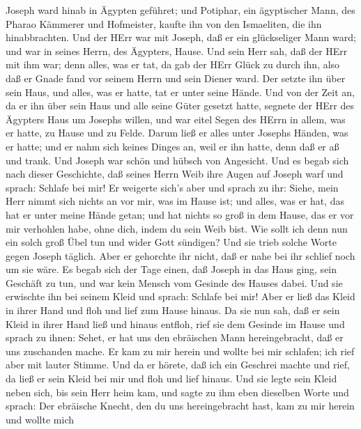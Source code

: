 Joseph ward hinab in Ägypten geführet; und Potiphar, ein
ägyptischer Mann, des Pharao Kämmerer und Hofmeister, kaufte ihn von den
Ismaeliten, die ihn hinabbrachten.  Und der HErr war mit
Joseph, daß er ein glückseliger Mann ward; und war in seines Herrn, des
Ägypters, Hause.  Und sein Herr sah, daß der HErr mit ihm
war; denn alles, was er tat, da gab der HErr Glück zu durch ihn,
 also daß er Gnade fand vor seinem Herrn und sein Diener
ward. Der setzte ihn über sein Haus, und alles, was er hatte, tat er
unter seine Hände.  Und von der Zeit an, da er ihn über sein
Haus und alle seine Güter gesetzt hatte, segnete der HErr des Ägypters
Haus um Josephs willen, und war eitel Segen des HErrn in allem, was er
hatte, zu Hause und zu Felde.  Darum ließ er alles unter
Josephs Händen, was er hatte; und er nahm sich keines Dinges an, weil er
ihn hatte, denn daß er aß und trank. Und Joseph war schön und hübsch von
Angesicht.  Und es begab sich nach dieser Geschichte, daß
seines Herrn Weib ihre Augen auf Joseph warf und sprach: Schlafe bei
mir!  Er weigerte sich's aber und sprach zu ihr: Siehe, mein
Herr nimmt sich nichts an vor mir, was im Hause ist; und alles, was er
hat, das hat er unter meine Hände getan;  und hat nichts so
groß in dem Hause, das er vor mir verhohlen habe, ohne dich, indem du
sein Weib bist. Wie sollt ich denn nun ein solch groß Übel tun und wider
Gott sündigen?  Und sie trieb solche Worte gegen Joseph
täglich. Aber er gehorchte ihr nicht, daß er nahe bei ihr schlief noch
um sie wäre.  Es begab sich der Tage einen, daß Joseph in
das Haus ging, sein Geschäft zu tun, und war kein Mensch vom Gesinde des
Hauses dabei.  Und sie erwischte ihn bei seinem Kleid und
sprach: Schlafe bei mir! Aber er ließ das Kleid in ihrer Hand und floh
und lief zum Hause hinaus.  Da sie nun sah, daß er sein
Kleid in ihrer Hand ließ und hinaus entfloh,  rief sie dem
Gesinde im Hause und sprach zu ihnen: Sehet, er hat uns den ebräischen
Mann hereingebracht, daß er uns zuschanden mache. Er kam zu mir herein
und wollte bei mir schlafen; ich rief aber mit lauter Stimme.
 Und da er hörete, daß ich ein Geschrei machte und rief, da
ließ er sein Kleid bei mir und floh und lief hinaus.  Und
sie legte sein Kleid neben sich, bis sein Herr heim kam, 
und sagte zu ihm eben dieselben Worte und sprach: Der ebräische Knecht,
den du uns hereingebracht hast, kam zu mir herein und wollte mich
